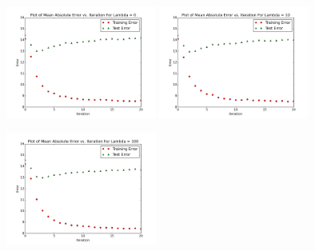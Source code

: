 \documentclass[10.5pt]{article}
\newcommand{\factwidth}{0.44}
\newcommand{\factheight}{1.6in}
\begin{document}
\begin{figure}[H]
\centering
\includegraphics[width=0\factwidth\textwidth,height=\factheight]{matrix_plots/test-i40d40l0.png}
\includegraphics[width=0\factwidth\textwidth,height=\factheight]{matrix_plots/test-i40d40l10.png}
\includegraphics[width=0\factwidth\textwidth,height=\factheight]{matrix_plots/test-i40d40l100.png}

\end{figure}
\end{document}
